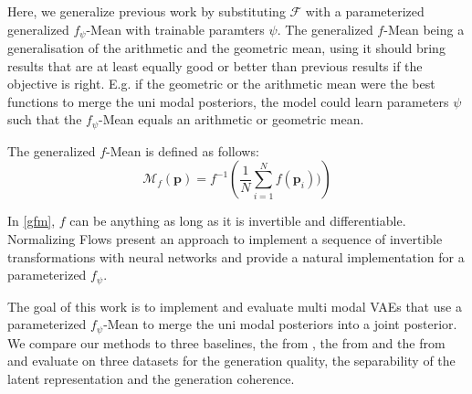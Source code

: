 
Here, we generalize previous work by substituting $\mathcal{F}$ with a parameterized generalized $f_{\psi}$-Mean \parencite{niculescu_convex_2018} with trainable paramters $\psi$.
The generalized $f$-Mean being a generalisation of the arithmetic and the geometric mean, using it should bring results that are at least equally good or better than previous results if the objective is right.
E.g. if the geometric or the arithmetic mean were the best functions to merge the uni modal posteriors, the model could learn parameters $\psi$ such that the $f_{\psi}$-Mean equals an arithmetic or geometric mean.

The generalized $f$-Mean is defined as follows:
\begin{equation}
    \label{gfm}
    \mathcal{M}_{f}\left( \textbf{p} \right) = f^{-1}\left( \frac{1}{N} \sum ^N _{i=1} f(\textbf{p}_i)) \right)
\end{equation}

In \cref{gfm}, $f$ can be anything as long as it is invertible and differentiable.
Normalizing Flows \parencite{papamakarios_normalizing_2019} present an approach to implement a sequence of invertible transformations with neural networks and provide a natural implementation for a parameterized $f_{\psi}$.




\bigskip
The goal of this work is to implement and evaluate multi modal VAEs that use a parameterized $f_{\psi}$-Mean to merge the uni modal posteriors into a joint posterior.
We compare our methods to three baselines, the  from \cite{poe}, the  from \cite{shi2019variational} and the  from \cite{thomas_gener-ELBO} and evaluate on three datasets for the generation quality, the separability of the latent representation and the generation coherence.

\vspace{3cm}

